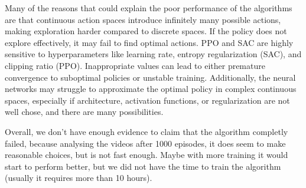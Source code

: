 \documentclass[../CSC_52081_EP.tex]{subfiles}
\begin{document}

Many of the reasons that could explain the poor performance of the algorithms are that continuous action spaces introduce infinitely many possible actions, making exploration harder compared to discrete spaces. If the policy does not explore effectively, it may fail to find optimal actions.
PPO and SAC are highly sensitive to hyperparameters like learning rate, entropy regularization (SAC), and clipping ratio (PPO). Inappropriate values can lead to either premature convergence to suboptimal policies or unstable training.
Additionally, the neural networks may struggle to approximate the optimal policy in complex continuous spaces, especially if architecture, activation functions, or regularization are not well chose, and there are many possibilities.

Overall, we don't have enough evidence to claim that the algorithm completly failed, because analysing the videos after 1000 episodes, it does seem to make reasonable choices, but is not fast enough. Maybe with more training it would start to perform better, but we did not have the time to train the algorithm (usually it requires more than 10 hours).
\end{document}
